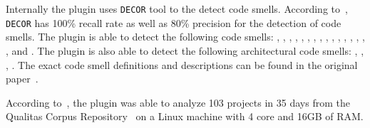Internally the  plugin uses \texttt{DECOR} tool to the detect code smells.
According to~\citeauthor{sonar-plugin-external}, \texttt{DECOR} has 100\% recall rate as well as 80\% precision
for the detection of code smells.
The plugin is able to detect the following code smells: , ,
, , , ,
, , , ,
, , ,
, , ,  and
.
The plugin is also able to detect the following architectural code smells:
, , ,
.
The exact code smell definitions and descriptions can be found in the original paper~\cite{sonar-plugin-external}.

According to~\citeauthor{sonar-plugin-external}, the plugin was able to analyze 103 projects in 35 days
from the Qualitas Corpus Repository~\cite{qualitas-corpus} on a Linux machine with 4 core and 16GB of RAM\@.
